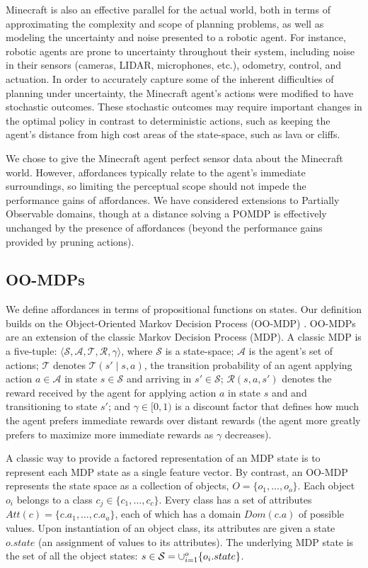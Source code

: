 \documentclass[conference]{IEEEtran}
\begin{document}
Minecraft is also an effective parallel for the actual world, both
in terms of approximating the complexity and scope of planning
problems, as well as modeling the uncertainty and noise presented to a
robotic agent.  For instance, robotic agents are prone to
uncertainty throughout their system, including noise in their
sensors (cameras, LIDAR, microphones, etc.), odometry, control, and
actuation.  In order to accurately capture some of the inherent
difficulties of planning under uncertainty, the Minecraft agent's
actions were modified to have stochastic outcomes. These stochastic
outcomes may require important changes in the optimal policy in
contrast to deterministic actions, such as keeping the agent's
distance from high cost areas of the state-space, such as lava or cliffs.

We chose to give the Minecraft agent perfect sensor data about the Minecraft world.
However, affordances typically relate to the agent's immediate surroundings,
so limiting the perceptual scope should not impede the performance gains of affordances.
We have considered extensions to Partially Observable domains, though at a distance
solving a POMDP is effectively unchanged by the presence of affordances (beyond the
performance gains provided by pruning actions).

\subsection{OO-MDPs}

We define affordances in terms of propositional functions on states. Our definition builds on the Object-Oriented Markov Decision Process
(OO-MDP) \cite{diuk08}.  OO-MDPs are an extension of
the classic Markov Decision Process (MDP).  A classic MDP is a
five-tuple: $\langle \mathcal{S}, \mathcal{A}, \mathcal{T},
\mathcal{R}, \gamma \rangle$, where $\mathcal{S}$ is a state-space;
$\mathcal{A}$ is the agent's set of actions; $\mathcal{T}$ denotes
$\mathcal{T}(s' \mid s,a)$, the transition probability of an agent
applying action $a \in \mathcal{A}$ in state $s \in \mathcal{S}$ and
arriving in $s' \in \mathcal{S}$; $\mathcal{R}(s,a,s')$ denotes the
reward received by the agent for applying action $a$ in state $s$ and
and transitioning to state $s'$; and $\gamma \in [0, 1)$ is a discount
  factor that defines how much the agent prefers immediate rewards
  over distant rewards (the agent more greatly prefers to maximize
  more immediate rewards as $\gamma$ decreases).

A classic way to provide a factored representation of an MDP state is to represent
each MDP state as a single feature vector. By contrast, an OO-MDP represents the state space as a collection of objects,
$O = \{o_1, \ldots, o_o \}$.  Each object $o_i$ belongs to a
class $c_j \in  \{c_1, \ldots, c_c\}$. Every class has a set of attributes
$Att(c) = \{c.a_1, \ldots, c.a_a \}$, each of which has a domain $Dom(c.a)$ of possible values.
Upon instantiation of an object class, its attributes are given a state $o.state$
(an assignment of values to its attributes).  The underlying MDP state is the set
of all the object states: $s \in {\cal S} = \cup_{i = 1}^o \{o_i.state\}$. 
\end{document}
